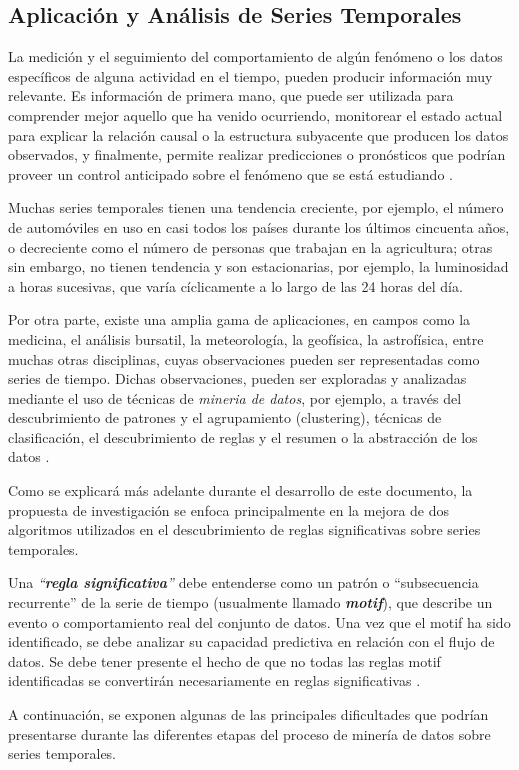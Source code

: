 \subsection{Aplicaci\'on y An\'alisis de Series Temporales}
La medici\'on y el seguimiento del comportamiento de alg\'un fen\'omeno o los datos espec\'ificos de alguna actividad en el tiempo, pueden producir informaci\'on muy relevante. Es informaci\'on de primera mano, que puede ser utilizada para comprender mejor aquello que ha venido ocurriendo, monitorear el estado actual para explicar la relaci\'on causal o la estructura subyacente que producen los datos observados, y finalmente, permite realizar predicciones o pron\'osticos que podr\'ian proveer un control anticipado sobre el fen\'omeno que se est\'a estudiando \cite{main}.\par
Muchas series temporales tienen una tendencia creciente, por ejemplo, el n\'umero de autom\'oviles en uso en casi todos los pa\'ises durante los \'ultimos cincuenta a\~nos, o decreciente como el n\'umero de personas que trabajan en la agricultura; otras sin embargo, no tienen tendencia y son estacionarias, por ejemplo, la luminosidad a horas sucesivas, que var\'ia c\'iclicamente a lo largo de las 24 horas del d\'ia.\par
Por otra parte, existe una amplia gama de aplicaciones, en campos como la medicina, el an\'alisis bursatil, la meteorolog\'ia, la geof\'isica, la astrof\'isica, entre muchas otras disciplinas, cuyas observaciones pueden ser representadas como series de tiempo. Dichas observaciones, pueden ser exploradas y analizadas mediante el uso de t\'ecnicas de \textit{mineria de datos}, por ejemplo, a trav\'es del descubrimiento de patrones y el agrupamiento (clustering), t\'ecnicas  de clasificaci\'on, el descubrimiento de reglas y el resumen o la abstracci\'on de los datos \cite{concepts}.\par
Como se explicar\'a m\'as adelante durante el desarrollo de este documento, la propuesta de investigaci\'on se enfoca principalmente en la mejora de dos algoritmos utilizados en el descubrimiento de reglas significativas sobre series temporales. \par 
Una \textit{\enquote{\textbf{regla significativa}}} debe entenderse como un patr\'on o \enquote{subsecuencia recurrente} de la serie de tiempo (usualmente llamado \textit{\textbf{motif}}), que describe un evento o comportamiento real del conjunto de datos. Una vez que el motif ha sido identificado, se debe analizar su capacidad predictiva en relaci\'on con el flujo de datos. Se debe tener presente el hecho de que no todas las reglas motif identificadas se convertir\'an necesariamente en reglas significativas \cite{main}.\par
A continuaci\'on, se exponen algunas de las principales dificultades que podr\'ian presentarse durante las diferentes etapas del proceso de  miner\'ia de datos sobre series temporales.
